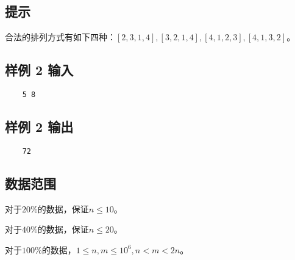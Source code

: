 \documentclass[12pt]{article}
\begin{document}
\subsection{提示}

合法的排列方式有如下四种：$[2, 3, 1, 4], [3, 2, 1, 4], [4, 1, 2, 3], [4, 1, 3, 2]$。

\subsection{样例 2 输入}

\begin{lstlisting}
    5 8
\end{lstlisting}

\subsection{样例 2 输出}

\begin{lstlisting}
    72
\end{lstlisting}

\subsection{数据范围}

对于$20\%$的数据，保证$n\leq 10$。\par
对于$40\%$的数据，保证$n\leq 20$。\par
对于$100\%$的数据，$1\leq n, m\leq 10^6, n < m < 2n$。
\end{document}
